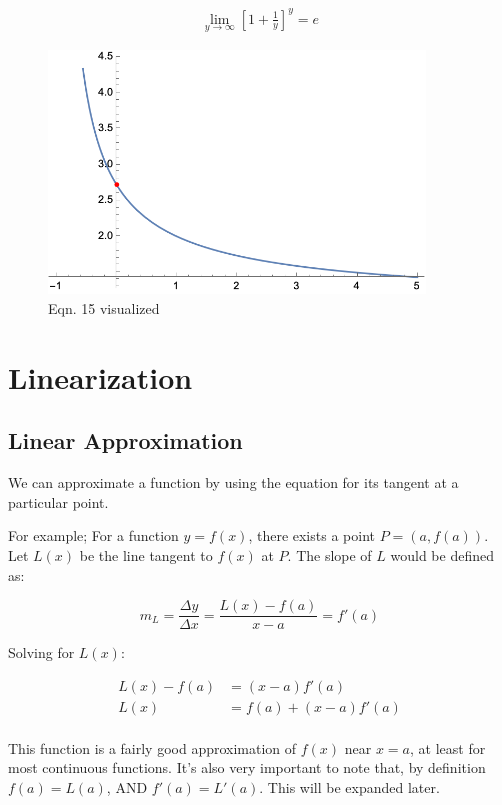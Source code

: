 \documentclass[12pt]{article}
\begin{document}
\begin{equation}
    \begin{split}
        \lim_{y\to\infty}[1+\frac{1}{y}]^y = e
    \end{split}
\end{equation}

\begin{figure}
    \centering
    \includegraphics[width=10.0cm]{misc/easalimit.png}
    \caption{Eqn. 15 visualized}
\end{figure}

\newpage
\section{Linearization}\label{sec:linearization}
\subsection{Linear Approximation}
We can approximate a function by using the equation for its tangent at a particular point.

For example; For a function $y=f(x)$, there exists a point $P = (a, f(a))$. Let $L(x)$ be the line tangent to $f(x)$ at $P$. The slope of $L$ would be defined as:

$$m_L = \frac{\Delta y}{\Delta x} = \frac{L(x) - f(a)}{x - a} = f'(a)$$

Solving for $L(x)$:

\begin{equation}
    \begin{split}
        L(x) - f(a) &= (x-a)f'(a)\\
        L(x) &= f(a) + (x-a)f'(a)\\
    \end{split}
\end{equation}

This function is a fairly good approximation of $f(x)$ near $x=a$, at least for most continuous functions. It's also very important to note that, by definition $f(a) = L(a)$, AND $f'(a) = L'(a)$. This will be expanded later.
\end{document}
